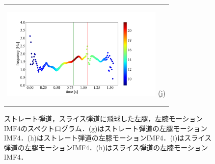 \begin{figure}
\begin{center}
\begin{tabular}{c}
            \begin{minipage}{0.5\hsize}
                \begin{center}
                    \includegraphics[width=8cm]{./images/opening_data/left_up_leg/IMF4.png}
                    (j)
                \end{center}
            \end{minipage}
        \end{tabular}
    \end{center}
    \caption{ストレート弾道，スライス弾道に飛球した左腿，左膝モーションIMF4のスペクトログラム．(g)はストレート弾道の左腿モーションIMF4．(h)はストレート弾道の左膝モーションIMF4．(i)はスライス弾道の左腿モーションIMF4．(h)はスライス弾道の左膝モーションIMF4．}
\end{figure}
